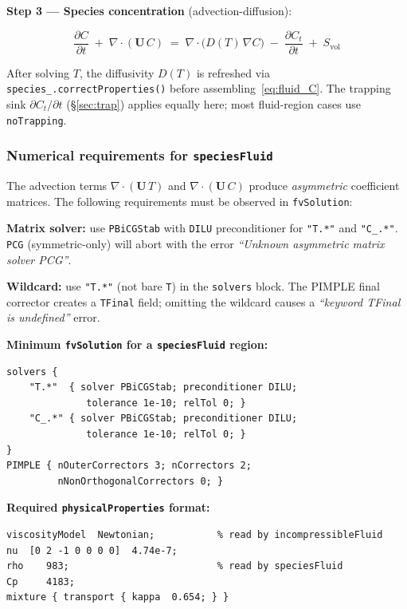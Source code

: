 \documentclass[11pt,a4paper]{article}
\newcommand{\pder}[2]{\frac{\partial #1}{\partial #2}}
\begin{document}
\textbf{Step 3 — Species concentration} (advection-diffusion):

\begin{tcolorbox}[eqbox,title={Species equation — \texttt{speciesFluid} regions}]
\begin{equation}\label{eq:fluid_C}
  \pder{C}{t}
  \;+\; \nabla\cdot(\mathbf{U}\,C)
  \;=\; \nabla\cdot\!\bigl(D(T)\,\nabla C\bigr)
  \;-\; \pder{C_t}{t}
  \;+\; S_\text{vol}
\end{equation}
\end{tcolorbox}

After solving $T$, the diffusivity $D(T)$ is refreshed via
\texttt{species\_.correctProperties()} before assembling~\eqref{eq:fluid_C}.
The trapping sink $\partial C_t/\partial t$ (§\ref{sec:trap}) applies equally
here; most fluid-region cases use \texttt{noTrapping}.

\subsubsection{Numerical requirements for \texttt{speciesFluid}}

The advection terms $\nabla\cdot(\mathbf{U}\,T)$ and $\nabla\cdot(\mathbf{U}\,C)$
produce \emph{asymmetric} coefficient matrices.  The following requirements
must be observed in \texttt{fvSolution}:

\begin{tcolorbox}[notebox]
\textbf{Matrix solver:} use \texttt{PBiCGStab} with \texttt{DILU} preconditioner
for \texttt{"T.*"} and \texttt{"C\_.*"}.  \texttt{PCG} (symmetric-only) will
abort with the error \textit{``Unknown asymmetric matrix solver PCG''}.

\textbf{Wildcard:} use \texttt{"T.*"} (not bare \texttt{T}) in the
\texttt{solvers} block.  The PIMPLE final corrector creates a \texttt{TFinal}
field; omitting the wildcard causes a \textit{``keyword TFinal is undefined''} error.
\end{tcolorbox}

\textbf{Minimum \texttt{fvSolution} for a \texttt{speciesFluid} region:}
\begin{verbatim}
solvers {
    "T.*"  { solver PBiCGStab; preconditioner DILU;
              tolerance 1e-10; relTol 0; }
    "C_.*" { solver PBiCGStab; preconditioner DILU;
              tolerance 1e-10; relTol 0; }
}
PIMPLE { nOuterCorrectors 3; nCorrectors 2;
         nNonOrthogonalCorrectors 0; }
\end{verbatim}

\textbf{Required \texttt{physicalProperties} format:}
\begin{verbatim}
viscosityModel  Newtonian;           % read by incompressibleFluid
nu  [0 2 -1 0 0 0 0]  4.74e-7;
rho    983;                          % read by speciesFluid
Cp     4183;
mixture { transport { kappa  0.654; } }
\end{verbatim}
\end{document}
